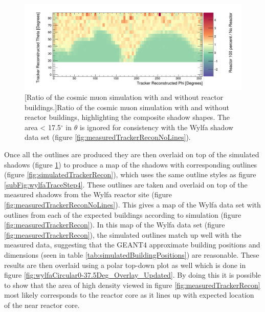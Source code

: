 \begin{figure}[!h]
 \centering
 \includegraphics[width=\linewidth]{Chapter5/Figs/wylfaRasterNew/simulatedTrackerReconNoLines.png}
 [Ratio of the cosmic muon simulation with and without reactor buildings.]{Ratio of the cosmic muon simulation with and without reactor buildings, highlighting the composite shadow shapes. The area < 17.5$^\circ$ in $\theta$ is ignored for consistency with the Wylfa shadow data set (figure \ref{fig:measuredTrackerReconNoLines}).} 
 \label{fig:simulatedTrackerReconNoLines}
\end{figure}

Once all the outlines are produced they are then overlaid on top of the simulated shadows (figure \ref{fig:simulatedTrackerReconNoLines}) to produce a map of the shadows with corresponding outlines (figure \ref{fig:simulatedTrackerRecon}), which uses the same outline styles as figure \ref{subFig:wylfaTraceStep4}. These outlines are taken and overlaid on top of the measured shadows from the Wylfa reactor site (figure \ref{fig:measuredTrackerReconNoLines}). This gives a map of the Wylfa data set with outlines from each of the expected buildings according to simulation (figure \ref{fig:measuredTrackerRecon}). In this map of the Wylfa data set (figure \ref{fig:measuredTrackerRecon}), the simulated outlines match up well with the measured data, suggesting that the GEANT4 approximate building positions and dimensions (seen in table \ref{tab:simulatedBuildingPositions}) are reasonable. These results are then overlaid using a polar top-down plot as well which is done in figure \ref{fig:wylfaCircular0-37.5Deg_Overlay_Updated}. By doing this it is possible to show that the area of high density viewed in figure \ref{fig:measuredTrackerRecon} most likely corresponds to the reactor core as it lines up with expected location of the near reactor core. 


